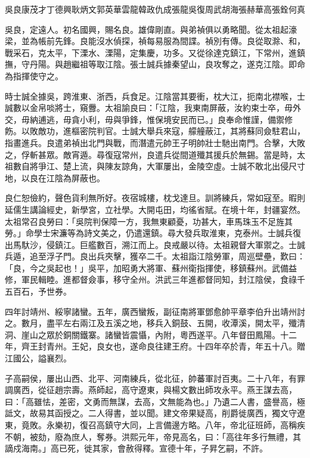 
\begin{pinyinscope}
吳良康茂才丁德興耿炳文郭英華雲龍韓政仇成張龍吳復周武胡海張赫華高張銓何真

吳良，定遠人。初名國興，賜名良。雄偉剛直。與弟禎俱以勇略聞。從太祖起濠梁，並為帳前先鋒。良能沒水偵探，禎每易服為間諜。禎別有傳。良從取滁、和，戰采石，克太平，下溧水、溧陽，定集慶，功多。又從徐達克鎮江，下常州，進鎮撫，守丹陽。與趙繼祖等取江陰。張士誠兵據秦望山，良攻奪之，遂克江陰。即命為指揮使守之。

時士誠全據吳，跨淮東、浙西，兵食足。江陰當其要衝，枕大江，扼南北襟喉，士誠數以金帛啖將士，窺釁。太祖諭良曰：「江陰，我東南屏蔽，汝約束士卒，毋外交，毋納逋逃，毋貪小利，毋與爭鋒，惟保境安民而已。」良奉命惟謹，備禦修飭。以敗敵功，進樞密院判官。士誠大舉兵來寇，艨艟蔽江，其將蘇同僉駐君山，指畫進兵。良遣弟禎出北門與戰，而潛遣元帥王子明帥壯士馳出南門。合擊，大敗之，俘斬甚眾。敵宵遁。尋復寇常州，良遣兵從間道殲其援兵於無錫。當是時，太祖數自將爭江、楚上流，與陳友諒角，大軍屢出，金陵空虛。士誠不敢北出侵尺寸地，以良在江陰為屏蔽也。

良仁恕儉約，聲色貨利無所好。夜宿城樓，枕戈達旦。訓將練兵，常如寇至。暇則延儒生講論經史，新學宮，立社學。大開屯田，均徭省賦。在境十年，封疆宴然。太祖常召良勞曰：「吳院判保障一方，我無東顧憂，功甚大，車馬珠玉不足旌其勞。」命學士宋濂等為詩文美之，仍遣還鎮。尋大發兵取淮東，克泰州。士誠兵復出馬馱沙，侵鎮江。巨艦數百，溯江而上。良戒嚴以待。太祖親督大軍禦之。士誠兵遁，追至浮子門。良出兵夾擊，獲卒二千。太祖詣江陰勞軍，周巡壁壘，歎曰：「良，今之吳起也！」吳平，加昭勇大將軍、蘇州衛指揮使，移鎮蘇州。武備益修，軍民輯睦。進都督僉事，移守全州。洪武三年進都督同知，封江陰侯，食祿千五百石，予世券。

四年討靖州、綏寧諸蠻。五年，廣西蠻叛，副征南將軍鄧愈帥平章李伯升出靖州討之。數月，盡平左右兩江及五溪之地，移兵入銅鼓、五開，收潭溪，開太平，殲清洞、崖山之眾於銅關鐵寨。諸蠻皆震懾，內附，粵西遂平。八年督田鳳陽。十二年，齊王封青州。王妃，良女也，遂命良往建王府。十四年卒於青，年五十八。贈江國公，謚襄烈。

子高嗣侯，屢出山西、北平、河南練兵，從北征，帥蕃軍討百夷。二十八年，有罪調廣西，從征趙宗壽。燕師起，高守遼東，與楊文數出師攻永平。燕王謀去高，曰：「高雖怯，差密，文勇而無謀，去高，文無能為也。」乃遺二人書，盛譽高，極詆文，故易其函授之。二人得書，並以聞。建文帝果疑高，削爵徙廣西，獨文守遼東，竟敗。永樂初，復召高鎮守大同，上言備邊方略。八年，帝北征班師，高稱疾不朝，被劾，廢為庶人，奪券。洪熙元年，帝見高名，曰：「高往年多行無禮，其謫戍海南。」高已死，徙其家，會赦得釋。宣德十年，子昇乞嗣，不許。


\end{pinyinscope}
